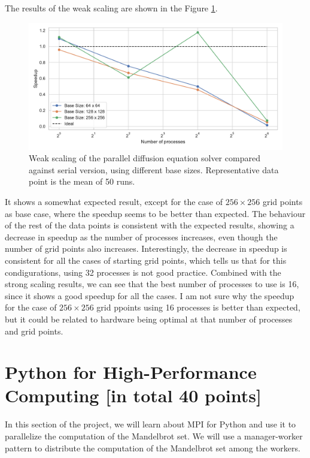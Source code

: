 \documentclass[unicode,11pt,a4paper,oneside,numbers=endperiod,openany]{scrartcl}
\begin{document}
The results of the weak scaling are shown in the Figure \ref{fig:weak}.
\begin{figure}[h!]
    \centering
    \includegraphics[width=\textwidth]{../mini_app/weak_scaling_plot.pdf}
    \caption{Weak scaling of the parallel diffusion equation solver compared against serial version, using different base sizes. Representative data point is the mean of 50 runs.}
    \label{fig:weak}
\end{figure}
It shows a somewhat expected result, except for the case of $256 \times 256$
grid points as base case, where the speedup seems to be better than expected.
The behaviour of the rest of the data points is consistent with the expected
results, showing a decrease in speedup as the number of processes increases,
even though the number of grid points also increases. Interestingly, the
decrease in speedup is consistent for all the cases of starting grid points,
which tells us that for this condigurations, using 32 processes is not good
practice. Combined with the strong scaling results, we can see that the best
number of processes to use is 16, since it shows a good speedup for all the
cases. I am not sure why the speedup for the case of $256 \times 256$ grid
ppoints using 16 processes is better than expected, but it could be related to hardware being
optimal at that number of processes and grid points.



\section{Python for High-Performance Computing [in total 40 points]}
In this section of the project, we will learn about MPI for Python and use it
to parallelize the computation of the Mandelbrot set. We will use a
manager-worker
pattern to distribute the computation of the Mandelbrot set among the workers.
\end{document}
